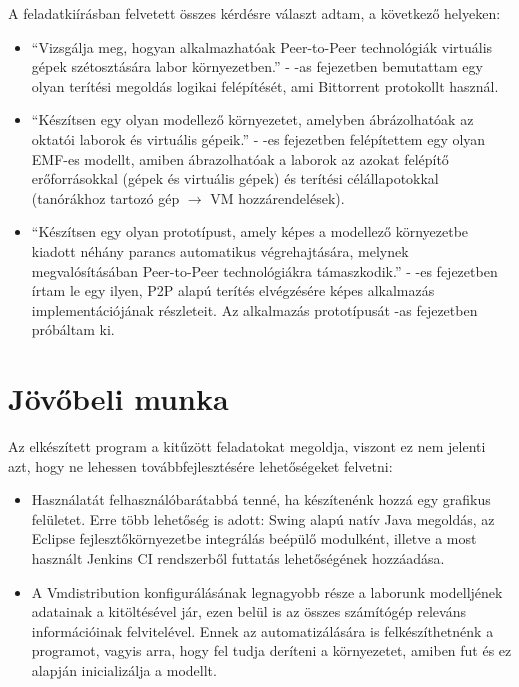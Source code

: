 A feladatkiírásban felvetett összes kérdésre választ adtam, a következő helyeken:

\begin{itemize}
  \item ``Vizsgálja  meg,  hogyan  alkalmazhatóak  Peer-to-Peer  technológiák  virtuális  gépek 
szétosztására labor környezetben.'' - -as fejezetben bemutattam egy olyan terítési megoldás logikai felépítését, ami Bittorrent protokollt használ.
  \item ``Készítsen  egy  olyan  modellező  környezetet,  amelyben  ábrázolhatóak  az  oktatói 
laborok és virtuális gépeik.'' - -es fejezetben felépítettem egy olyan EMF-es modellt, amiben ábrazolhatóak a laborok az azokat felépítő erőforrásokkal (gépek és virtuális gépek) és terítési célállapotokkal (tanórákhoz tartozó gép $\rightarrow$ VM hozzárendelések).
  \item ``Készítsen egy olyan prototípust, amely képes a modellező környezetbe kiadott  néhány
parancs  automatikus  végrehajtására,  melynek  megvalósításában  Peer-to-Peer 
technológiákra támaszkodik.'' - -es fejezetben írtam le egy ilyen, P2P alapú terítés elvégzésére képes alkalmazás implementációjának részleteit. Az alkalmazás prototípusát -as fejezetben próbáltam ki.
\end{itemize}


\section{Jövőbeli munka}
Az elkészített program a kitűzött feladatokat megoldja, viszont ez nem jelenti azt, hogy ne lehessen továbbfejlesztésére lehetőségeket felvetni:
\begin{itemize}
  \item Használatát felhasználóbarátabbá tenné, ha készítenénk hozzá egy grafikus felületet. Erre több lehetőség is adott: Swing\cite{zukowski2005definitive} alapú natív Java megoldás, az Eclipse fejlesztőkörnyezetbe integrálás beépülő modulként, illetve a most használt Jenkins CI rendszerből futtatás lehetőségének hozzáadása.
  \item A Vmdistribution konfigurálásának legnagyobb része a laborunk modelljének adatainak a kitöltésével jár, ezen belül is az összes számítógép releváns információinak felvitelével. Ennek az automatizálására is felkészíthetnénk a programot, vagyis arra, hogy fel tudja deríteni a környezetet, amiben fut és ez alapján inicializálja a modellt.
\end{itemize}

